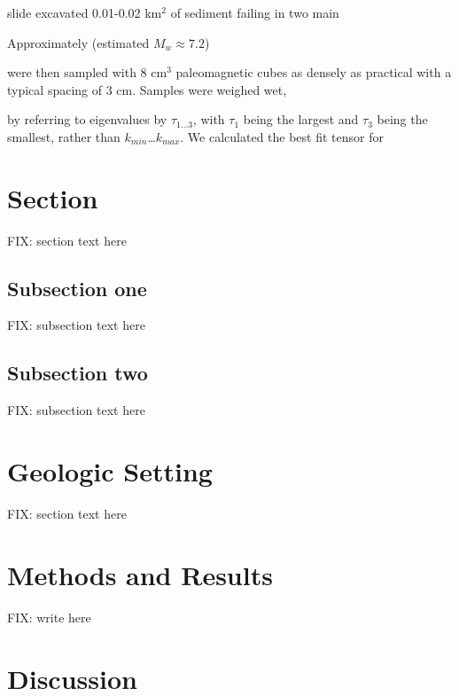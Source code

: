 \documentclass[agupp]{aguplus}
\begin{document}
\begin{article}
\begin{table}[htb]
\caption{FIX: write caption here.  Note that the * character in the table block makes this float outside of the two columns.  The centering tag seems to be the best way to do centering.}
\label{tab:coreloctab} 
\end{table}

slide excavated 0.01-0.02 km$^2$ of sediment failing in two main

Approximately (estimated $M_w \approx 7.2$)

were then sampled with 8 cm$^3$ paleomagnetic cubes as densely as
practical with a typical spacing of 3 cm.  Samples were weighed wet,


by referring to eigenvalues by $\tau_{1\ldots3}$, with
$\tau_1$ being the largest and $\tau_3$ being the smallest, rather
than $k_{min}$\ldots$k_{max}$.  We calculated the best fit tensor for


\section{Section}

FIX: section text here

\subsection{Subsection one}

FIX: subsection text here

\subsection{Subsection two}

FIX: subsection text here

\section{Geologic Setting}

FIX: section text here



\section{Methods and Results}

FIX: write here


\section{Discussion}


\end{article}
\end{document}
